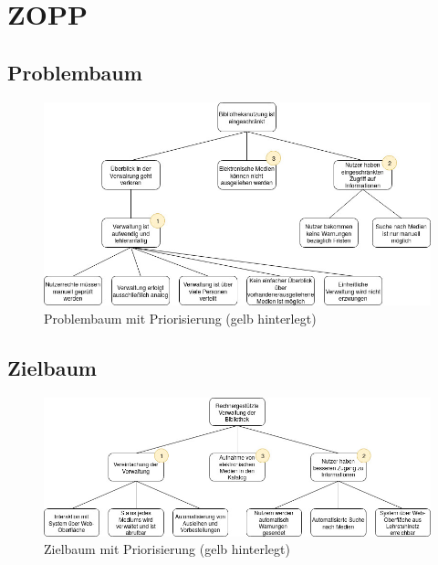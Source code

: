 \documentclass[12pt, a4paper]{article}
\begin{document}
\section{ZOPP}
\subsection{Problembaum}
\begin{figure}[h]
	\includegraphics[width=\textwidth]{zopp_probleme.jpg}
	\caption{Problembaum mit Priorisierung (gelb hinterlegt)}
\end{figure}

\subsection{Zielbaum}
\begin{figure}[h]
	\includegraphics[width=\textwidth]{zopp_ziele.jpg}
	\caption{Zielbaum mit Priorisierung (gelb hinterlegt)}
\end{figure}
\end{document}
